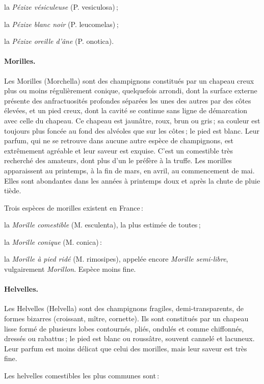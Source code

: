 la \textit{Pézize vésiculeuse} (P. vesiculosa) ;

la \textit{Pézize blanc noir} (P. leucomelas) ;

la \textit{Pézize oreille d'âne} (P. onotica).

\paragraph{Morilles.}

Les Morilles (Morchella) sont des champignons constitués par un chapeau creux
plus ou moins régulièrement conique, quelquefois arrondi, dont la surface
externe présente des anfractuosités profondes séparées les unes des autres par
des côtes élevées, et un pied creux, dont la cavité se continue sans ligne de
démarcation avec celle du chapeau. Ce chapeau est jaunâtre, roux, brun ou
gris ; sa couleur est toujours plus foncée au fond des alvéoles que sur les
côtes ; le pied est blanc. Leur parfum, qui ne se retrouve dans aucune autre
espèce de champignons, est extrêmement agréable et leur saveur est exquise.
C'est un comestible très recherché des amateurs, dont plus d'un le préfère à la
truffe. Les morilles apparaissent au printemps, à la fin de mars, en avril, au
commencement de mai. Elles sont abondantes dans les années à printemps doux et
après la chute de pluie tiède.

Trois espèces de morilles existent en France :

la \textit{Morille comestible} (M. esculenta), la plus estimée de toutes ;

la \textit{Morille conique} (M. conica) :

la \textit{Morille à pied ridé} (M. rimosipes), appelée encore \textit{Morille
semi-libre}, vulgairement \textit{Morillon}. Espèce moins fine.

\paragraph{Helvelles.}

Les Helvelles (Helvella) sont des champignons fragiles, demi-transparents, de
formes bizarres (croissant, mître, cornette). Ils sont constitués par un
chapeau lisse formé de plusieurs lobes contournés, pliés, ondulés et comme
chiffonnés, dressés ou rabattus ; le pied est blanc ou roussâtre, souvent
cannelé et lacuneux. Leur parfum est moins délicat que celui des morilles, mais
leur saveur est très fine.

Les helvelles comestibles les plus communes sont :

